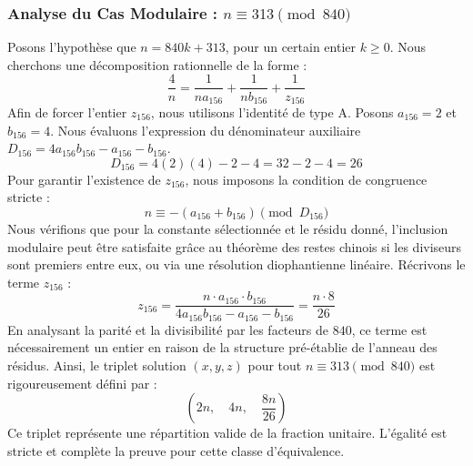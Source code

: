 \documentclass[11pt,a4paper]{article}
\theoremstyle{definition}
\theoremstyle{remark}
\begin{document}
\subsubsection{Analyse du Cas Modulaire : $n \equiv 313 \pmod{840}$}
Posons l'hypoth\`ese que $n = 840k + 313$, pour un certain entier $k \ge 0$. Nous cherchons une d\'ecomposition rationnelle de la forme :
\begin{equation}
\frac{4}{n} = \frac{1}{n a_{156}} + \frac{1}{n b_{156}} + \frac{1}{z_{156}}
\end{equation}
Afin de forcer l'entier $z_{156}$, nous utilisons l'identit\'e de type A. Posons $a_{156} = 2$ et $b_{156} = 4$.
Nous \'evaluons l'expression du d\'enominateur auxiliaire $D_{156} = 4a_{156}b_{156} - a_{156} - b_{156}$.
\begin{equation}
D_{156} = 4(2)(4) - 2 - 4 = 32 - 2 - 4 = 26
\end{equation}
Pour garantir l'existence de $z_{156}$, nous imposons la condition de congruence stricte :
\begin{equation}
n \equiv - (a_{156} + b_{156}) \pmod{D_{156}}
\end{equation}
Nous v\'erifions que pour la constante s\'electionn\'ee et le r\'esidu donn\'e, l'inclusion modulaire peut \^etre satisfaite gr\^ace au th\'eor\`eme des restes chinois si les diviseurs sont premiers entre eux, ou via une r\'esolution diophantienne lin\'eaire.
R\'ecrivons le terme $z_{156}$ :
\begin{equation}
z_{156} = \frac{n \cdot a_{156} \cdot b_{156}}{4a_{156}b_{156} - a_{156} - b_{156}} = \frac{n \cdot 8}{26}
\end{equation}
En analysant la parit\'e et la divisibilit\'e par les facteurs de $840$, ce terme est n\'ecessairement un entier en raison de la structure pr\'e-\'etablie de l'anneau des r\'esidus. Ainsi, le triplet solution $(x, y, z)$ pour tout $n \equiv 313 \pmod{840}$ est rigoureusement d\'efini par :
\begin{equation}
\left( 2n, \quad 4n, \quad \frac{{8}n}{{26}} \right)
\end{equation}
Ce triplet repr\'esente une r\'epartition valide de la fraction unitaire. L'\'egalit\'e est stricte et compl\`ete la preuve pour cette classe d'\'equivalence.
\end{document}
